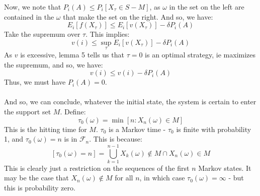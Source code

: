 \documentclass[12pt,a4paper]{article}
\newcommand{\1}[1]{\mathbbm{1}\left\{ #1 \right\}}
\newcommand{\fcal}{\mathcal{F}}
\begin{document}
Now, we note that $P_i(A) \leq P_i\left[X_\tau \in S - M\right]$, as $\omega$ in the set on the left are contained in the $\omega$ that make the set on the right. And so, we have:
$$
	E_i\left[f(X_\tau)\right] \leq
	E_i\left[v(X_\tau)\right] - \delta P_i(A)
$$
Take the supremum over $\tau$. This implies:
$$
	v(i) \leq \sup_\tau E_i\left[v(X_\tau)\right] - \delta P_i(A)
$$
As $v$ is excessive, lemma 5 tells us that $\tau = 0$ is an optimal strategy, ie maximizes the supremum, and so, we have:
$$
	v(i) \leq v(i) - \delta P_i(A)
$$
Thus, we must have $P_i(A) = 0$.
\\\\
And so, we can conclude, whatever the initial state, the system is certain to enter the support set $M$. Define:
$$
	\tau_0(\omega) = \min\left[n : X_n(\omega) \in M\right]
$$
This is the hitting time for $M$. $\tau_0$ is a Markov time - $\tau_0$ is finite with probability 1, and $\tau_0(\omega) = n$ is in $\fcal_n$. This is because:
$$
	\left[\tau_0(\omega) = n\right] = \bigcup_{k = 1}^{n-1} X_k(\omega) \not\in M \cap X_n(\omega) \in M
$$
This is clearly just a restriction on the sequences of the first $n$ Markov states. It may be the case that $X_n(\omega) \not\in M$ for all $n$, in which case $\tau_0(\omega) = \infty$ - but this is probability zero.
\end{document}
